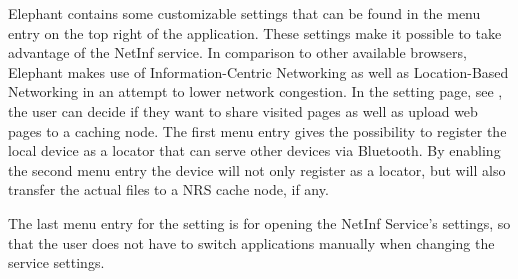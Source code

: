 Elephant contains some customizable settings that can be found in the menu entry on the top right of the application.
These settings make it possible to take advantage of the NetInf service. In comparison to other
available browsers, Elephant makes use of Information-Centric Networking as well as Location-Based Networking
in an attempt to lower network congestion.
In the setting page, see , the user can decide if they want to share visited pages as well as upload web pages to a caching node.
The first menu entry gives the possibility to register the local device as a locator that can serve other devices via Bluetooth.
By enabling the second menu entry the device will not only register as a locator, but will also transfer the actual files to a NRS cache node, if any.

The last menu entry for the setting is for opening the NetInf Service's settings, so that the user does not have to switch applications
manually when changing the service settings.
\newpage

